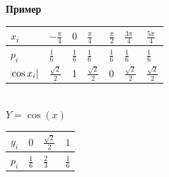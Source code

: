 \documentclass[russian, 12pt, fleqn]{article}
\begin{document}
\textbf{Пример}\\
\begin{tabular}[b]{ | l | l |  l | l |  l | l | l |  }
\hline
$x_i$&$-\frac{\pi}{4}$&$0$&$\frac{\pi}{4}$&$\frac{\pi}{2}$&$\frac{3\pi}{4}$&$\frac{5\pi}{4}$\\
\hline
$p_i$&$\frac{1}{6}$&$\frac{1}{6}$&$\frac{1}{6}$&$\frac{1}{6}$&$\frac{1}{6}$&$\frac{1}{6}$\\
\hline
$\abs{\cos x_i}$&$\frac{\sqrt{2}}{2}$&1&$\frac{\sqrt{2}}{2}$&0&$\frac{\sqrt{2}}{2}$&$\frac{\sqrt{2}}{2}$\\
\hline
\end{tabular}\\
$Y=\cos(x)$\\
\begin{tabular}[b]{ | l | l |  l | l |}
\hline
$y_i$ &$0$ & $\frac{\sqrt{2}}{2}$&$1$\\
\hline
$p_i$ & $\frac{1}{6}$ & $\frac{2}{3}$ & $\frac{1}{6}$\\
\hline
\end{tabular}\\
\end{document}
